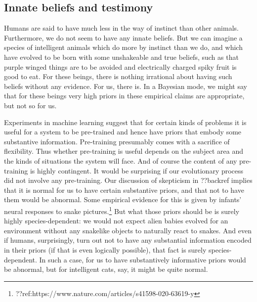 \subsection{Innate beliefs and testimony}
Humans are said to have much less in the way of instinct than other animals. Furthermore, we do not seem to
have any innate beliefs. But we can imagine a species of intelligent animals which do more by instinct than we do,
and which have evolved to be born with some unshakeable and true beliefs, such as that purple winged things are to 
be avoided and electrically charged spiky fruit is good to eat. For these beings, there is nothing irrational about 
having such beliefs without any evidence. For us, there is. In a Bayesian mode, we might say that for these
beings very high priors in these empirical claims are appropriate, but not so for us. 

Experiments in machine learning suggest that for certain kinds of problems it is useful for a system to be pre-trained
and hence have priors that embody some substantive information. Pre-training presumably comes with a sacrifice of flexibility.
Thus whether pre-training is useful depends on the subject area and the kinds of situations the system will face. And
of course the content of any pre-training is highly contingent. It would be surprising if our evolutionary process did not 
involve any pre-training. Our discussion of skepticism in ??backref implies that it is normal for us to have certain substantive 
priors, and that not to have them would be abnormal. Some empirical evidence for this is given by infants' neural responses to
snake pictures.\footnote{??ref:https://www.nature.com/articles/s41598-020-63619-y} But what those priors should be is surely highly 
species-dependent: we would not expect alien babies evolved for an environment without any snakelike objects to naturally
react to snakes. And even if humans, surprisingly, turn out not to have any substantial information encoded in their priors (if that is even logically 
possible), that fact is surely species-dependent. In such a case, for us to have substantively informative priors would be
abnormal, but for intelligent cats, say, it might be quite normal. 

